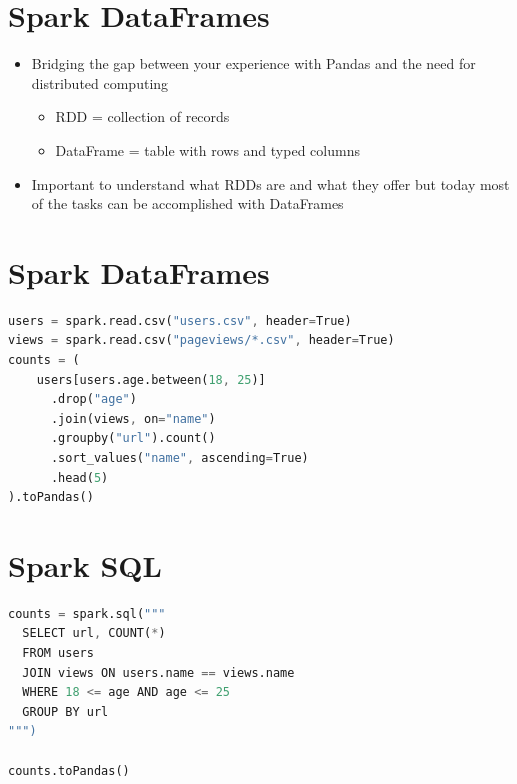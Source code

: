 \documentclass[11pt]{article}
\begin{document}
\section*{Spark DataFrames}
\begin{itemize}
	\item Bridging the gap between your experience with Pandas and the need for distributed computing
		\begin{itemize}
			\item RDD = collection of records
			\item DataFrame = table with rows and typed columns
		\end{itemize}
	\item Important to understand what RDDs are and what they offer but today most of the tasks can be accomplished with DataFrames
\end{itemize}

\section*{Spark DataFrames}
\begin{lstlisting}[language=Octave]
users = spark.read.csv("users.csv", header=True)
views = spark.read.csv("pageviews/*.csv", header=True)
counts = (
    users[users.age.between(18, 25)]
      .drop("age")
      .join(views, on="name")
      .groupby("url").count()
      .sort_values("name", ascending=True)
      .head(5)
).toPandas()
\end{lstlisting}

\section*{Spark SQL}
\begin{lstlisting}[language=Octave]
counts = spark.sql("""
  SELECT url, COUNT(*)
  FROM users 
  JOIN views ON users.name == views.name
  WHERE 18 <= age AND age <= 25
  GROUP BY url
""")

counts.toPandas()
\end{lstlisting}
\end{document}
